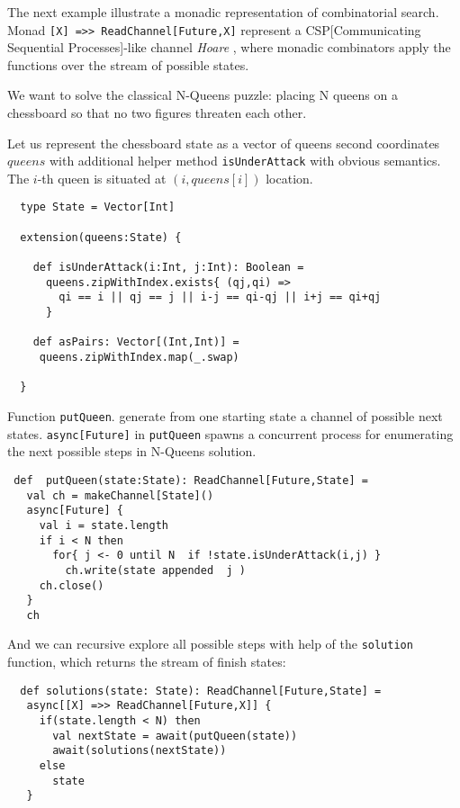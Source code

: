 \documentclass{llncs}
\begin{document}
\label{CombSearch}

 The next example illustrate a monadic representation of combinatorial search. Monad 
   \lstinline|[X] =>> ReadChannel[Future,X]| represent a CSP[Communicating Sequential Processes]-like channel {\it Hoare} \cite{hoare1985communicating}, 
  where monadic combinators apply the functions over the stream of possible states.

We want to solve the classical N-Queens puzzle: placing N queens on a chessboard so that no two figures threaten each other.  

Let us represent the chessboard state as a vector of queens second coordinates $queens$ with additional helper method \lstinline|isUnderAttack| with obvious semantics.  The $i$-th queen is situated at $(i,queens[i])$ location.

\begin{lstlisting}
  type State = Vector[Int]
     
  extension(queens:State) {

    def isUnderAttack(i:Int, j:Int): Boolean = 
      queens.zipWithIndex.exists{ (qj,qi) => 
        qi == i || qj == j || i-j == qi-qj || i+j == qi+qj
      }
      
    def asPairs: Vector[(Int,Int)] =
     queens.zipWithIndex.map(_.swap)

  }
\end{lstlisting}

 Function \lstinline|putQueen|. generate from one starting state a channel of possible next states.
 \lstinline|async[Future]| in \lstinline|putQueen| spawns a concurrent process for enumerating the next possible steps in N-Queens solution.  

\begin{lstlisting}
 def  putQueen(state:State): ReadChannel[Future,State] =
   val ch = makeChannel[State]()
   async[Future] {
     val i = state.length
     if i < N then
       for{ j <- 0 until N  if !state.isUnderAttack(i,j) }
         ch.write(state appended  j )
     ch.close()
   }
   ch
\end{lstlisting}

And we can recursive explore all possible steps with help of the \verb|solution| function, which returns the stream of finish states:

\begin{lstlisting}
  def solutions(state: State): ReadChannel[Future,State] =
   async[[X] =>> ReadChannel[Future,X]] {
     if(state.length < N) then
       val nextState = await(putQueen(state))
       await(solutions(nextState))
     else
       state   
   }
\end{lstlisting}
\end{document}
